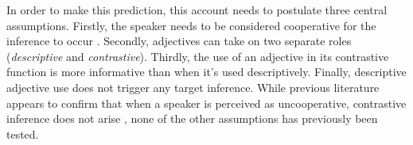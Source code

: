 \documentclass[a4paper,man,floatsintext,natbib]{apa6}
\newcommand{\ek}[1]{\textcolor{Orange}{[ek: #1]}}
\newcommand{\figref}[1]{Figure~\ref{#1}}
\begin{document}


In order to make this prediction, this account needs to postulate three central assumptions. Firstly, the speaker needs to be considered cooperative for the inference to occur \citep{Grodner:2011}. Secondly, adjectives can take on two separate roles (\emph{descriptive} and \emph{contrastive}). Thirdly, the use of an adjective in its contrastive function is more informative than when it's used descriptively. Finally, descriptive adjective use does not trigger any target inference.
While previous literature appears to confirm that when a speaker is perceived as uncooperative, contrastive inference does not arise \citep{Grodner:2011,Ryskin:2019}, none of the other assumptions has previously been tested.
\end{document}
